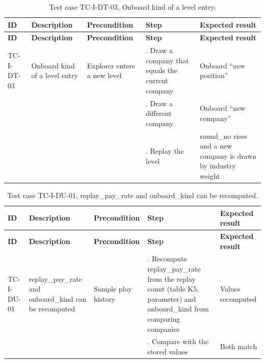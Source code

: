 {\small
\begin{longtable}{|>{\raggedright\arraybackslash}p{}|>{\raggedright\arraybackslash}p{}|>{\raggedright\arraybackslash}p{}|>{\raggedright\arraybackslash}p{}|>{\raggedright\arraybackslash}p{}|}
\caption{Test case TC-I-DT-03, Onboard kind of a level entry.} \\
\hline
\textbf{ID} & \textbf{Description} & \textbf{Precondition} & \textbf{Step} & \textbf{Expected result} \\ \hline
\endfirsthead
\hline
\textbf{ID} & \textbf{Description} & \textbf{Precondition} & \textbf{Step} & \textbf{Expected result} \\ \hline
\endhead
TC-I-DT-03 & Onboard kind of a level entry & Explorer enters a new level & 1. Draw a company that equals the current company & Onboard ``new position'' \\ \hline
 &  &  & 2. Draw a different company & Onboard ``new company'' \\ \hline
 &  &  & 3. Replay the level & round\_no rises and a new company is drawn by industry weight \\ \hline
\end{longtable}
}

{\small
\begin{longtable}{|>{\raggedright\arraybackslash}p{}|>{\raggedright\arraybackslash}p{}|>{\raggedright\arraybackslash}p{}|>{\raggedright\arraybackslash}p{}|>{\raggedright\arraybackslash}p{}|}
\caption{Test case TC-I-DU-01, replay\_pay\_rate and onboard\_kind can be recomputed.} \\
\hline
\textbf{ID} & \textbf{Description} & \textbf{Precondition} & \textbf{Step} & \textbf{Expected result} \\ \hline
\endfirsthead
\hline
\textbf{ID} & \textbf{Description} & \textbf{Precondition} & \textbf{Step} & \textbf{Expected result} \\ \hline
\endhead
TC-I-DU-01 & replay\_pay\_rate and onboard\_kind can be recomputed & Sample play history & 1. Recompute replay\_pay\_rate from the replay count (table K5, parameter) and onboard\_kind from comparing companies & Values recomputed \\ \hline
 &  &  & 2. Compare with the stored values & Both match \\ \hline
\end{longtable}
}

